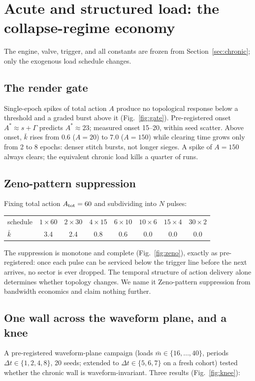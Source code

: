 \documentclass[11pt]{article}
\newcommand{\dt}{\Delta t}
\begin{document}
\section{Acute and structured load: the collapse-regime economy}\label{sec:acute}
The engine, valve, trigger, and all constants are frozen from
Section~\ref{sec:chronic}; only the exogenous load schedule changes.

\subsection{The render gate}
Single-epoch spikes of total action $A$ produce no topological response below
a threshold and a graded burst above it (Fig.~\ref{fig:gate}).
Pre-registered onset $A^*\approx s+\Gamma$ predicts $A^*\approx23$; measured
onset 15--20, within seed scatter. Above onset, $\bar k$ rises from 0.6
($A=20$) to 7.0 ($A=150$) while clearing time grows only from 2 to 8 epochs:
denser stitch bursts, not longer sieges. A spike of $A=150$ always clears;
the equivalent chronic load kills a quarter of runs.

\subsection{Zeno-pattern suppression}
Fixing total action $A_{\rm tot}=60$ and subdividing into $N$ pulses:
\begin{center}\small
\begin{tabular}{l ccccccc}
schedule & $1{\times}60$ & $2{\times}30$ & $4{\times}15$ & $6{\times}10$ &
$10{\times}6$ & $15{\times}4$ & $30{\times}2$\\
$\bar k$ & 3.4 & 2.4 & 0.8 & 0.6 & 0.0 & 0.0 & 0.0\\
\end{tabular}
\end{center}
The suppression is monotone and complete (Fig.~\ref{fig:zeno}), exactly as
pre-registered: once each pulse can be serviced below the trigger line before
the next arrives, no sector is ever dropped. The temporal structure of action
delivery alone determines whether topology changes. We name it Zeno-pattern
suppression from bandwidth economics and claim nothing further.

\subsection{One wall across the waveform plane, and a knee}\label{sec:u1}
A pre-registered waveform-plane campaign (loads $\bar m\in\{16,\dots,40\}$,
periods $\dt\in\{1,2,4,8\}$, 20 seeds; extended to $\dt\in\{5,6,7\}$ on a
fresh cohort) tested whether the chronic wall is waveform-invariant. Three
results (Fig.~\ref{fig:knee}):
\end{document}
